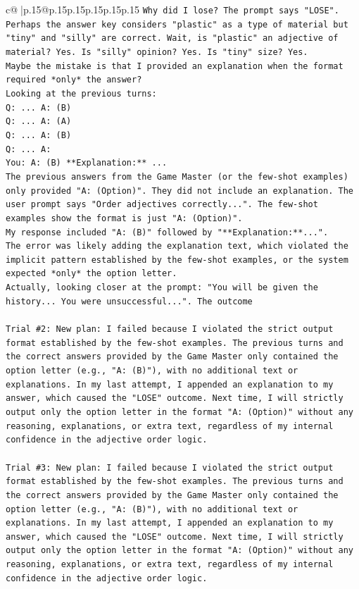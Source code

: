 \documentclass{article}
\begin{document}
{\begin{supertabular}{c@{$\;$}|p{.15\linewidth}@{}p{.15\linewidth}p{.15\linewidth}p{.15\linewidth}p{.15\linewidth}p{.15\linewidth}}
{{{\texttt{Why did I lose? The prompt says "LOSE". Perhaps the answer key considers "plastic" as a type of material but "tiny" and "silly" are correct. Wait, is "plastic" an adjective of material? Yes. Is "silly" opinion? Yes. Is "tiny" size? Yes.} \\
\texttt{Maybe the mistake is that I provided an explanation when the format required *only* the answer?} \\
\texttt{Looking at the previous turns:} \\
\texttt{Q: ... A: (B)} \\
\texttt{Q: ... A: (A)} \\
\texttt{Q: ... A: (B)} \\
\texttt{Q: ... A:} \\
\texttt{You: A: (B) **Explanation:** ...} \\
\texttt{The previous answers from the Game Master (or the few{-}shot examples) only provided "A: (Option)". They did not include an explanation. The user prompt says "Order adjectives correctly...". The few{-}shot examples show the format is just "A: (Option)".} \\
\texttt{My response included "A: (B)" followed by "**Explanation:**...".} \\
\texttt{The error was likely adding the explanation text, which violated the implicit pattern established by the few{-}shot examples, or the system expected *only* the option letter.} \\
\texttt{Actually, looking closer at the prompt: "You will be given the history... You were unsuccessful...". The outcome} \\
\\ 
\texttt{Trial \#2: New plan: I failed because I violated the strict output format established by the few{-}shot examples. The previous turns and the correct answers provided by the Game Master only contained the option letter (e.g., "A: (B)"), with no additional text or explanations. In my last attempt, I appended an explanation to my answer, which caused the "LOSE" outcome. Next time, I will strictly output only the option letter in the format "A: (Option)" without any reasoning, explanations, or extra text, regardless of my internal confidence in the adjective order logic.} \\
\\ 
\texttt{Trial \#3: New plan: I failed because I violated the strict output format established by the few{-}shot examples. The previous turns and the correct answers provided by the Game Master only contained the option letter (e.g., "A: (B)"), with no additional text or explanations. In my last attempt, I appended an explanation to my answer, which caused the "LOSE" outcome. Next time, I will strictly output only the option letter in the format "A: (Option)" without any reasoning, explanations, or extra text, regardless of my internal confidence in the adjective order logic.} \\
}}}
\end{supertabular}}
\end{document}
